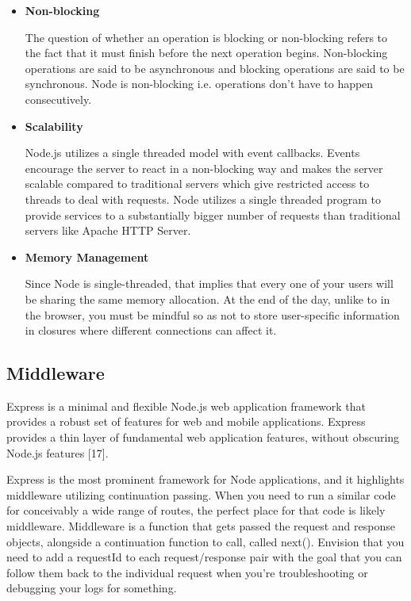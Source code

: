 \documentclass[../thesis.tex]{subfiles}
\begin{document}
\begin{itemize}
    \item \textbf{Non-blocking}
    \newline
    
    The question of whether an operation is blocking or non-blocking refers to the fact that it must finish before the next operation begins. Non-blocking operations are said to be asynchronous and blocking operations are said to be synchronous. Node is non-blocking i.e. operations don't have to happen consecutively.
    \newline
    
    \item \textbf{Scalability}
    \newline
    
    Node.js utilizes a single threaded model with event callbacks. Events encourage the server to react in a non-blocking way and makes the server scalable compared to traditional servers which give restricted access to threads to deal with requests. Node utilizes a single threaded program to provide services to a substantially bigger number of requests than traditional servers like Apache HTTP Server.
    \newline
    
    \item \textbf{Memory Management}
    \newline
    
    Since Node is single-threaded, that implies that every one of your users will be sharing the same memory allocation. At the end of the day, unlike to in the browser, you must be mindful so as not to store user-specific information in closures where different connections can affect it.
\end{itemize}
\subsection*{Middleware}
Express is a minimal and flexible Node.js web application framework that provides a robust set of features for web and mobile applications.  Express provides a thin layer of fundamental web application features, without obscuring Node.js features [17].
\newline

Express is the most prominent framework for Node applications, and it highlights middleware utilizing continuation passing. When you need to run a similar code for conceivably a wide range of routes, the perfect place for that code is likely middleware. 
Middleware is a function that gets passed the request and response objects, alongside a continuation function to call, called next(). Envision that you need to add a requestId to each request/response pair with the goal that you can follow them back to the individual request when you're troubleshooting or debugging your logs for something.
\newline
\end{document}
